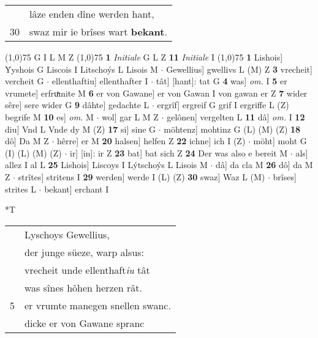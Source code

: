 \documentclass[8pt,a4paper,notitlepage]{article}
\begin{document}
\begin{table}[ht]
\begin{minipage}[t]{0.5\linewidth}
\begin{tabular}{rl}
 & lâze enden dîne werden hant,\\ 
30 & swaz mir ie brîses wart \textbf{bekant}.\\ 
\end{tabular}
\scriptsize
\line(1,0){75} \newline
G I L M Z \newline
\line(1,0){75} \newline
\textbf{1} \textit{Initiale} G L Z  \textbf{11} \textit{Initiale} I  \newline
\line(1,0){75} \newline
\textbf{1} Lishois] Ẏyshois G Liscois I Litschoýs L Lisois M  $\cdot$ Gewellius] gwellivs L (M) Z \textbf{3} vrecheit] vercheit G  $\cdot$ ellenthaftiu] ellenthafter I  $\cdot$ tât] [hant]: tat G \textbf{4} was] \textit{om.} I \textbf{5} er vrumete] erfruͯmite M \textbf{6} er von Gawane] er von Gawan I von gawan er Z \textbf{7} wider sêre] sere wider G \textbf{9} dâhte] gedachte L  $\cdot$ ergrîf] ergreif G grif I ergriffe L (Z) begrife M \textbf{10} es] \textit{om.} M  $\cdot$ wol] gar L M Z  $\cdot$ gelônen] vergelten L \textbf{11} dâ] \textit{om.} I \textbf{12} diu] Vnd L Vnde dy M (Z) \textbf{17} si] sine G  $\cdot$ möhtenz] mohtinz G (L) (M) (Z) \textbf{18} dô] Da M Z  $\cdot$ hêrre] er M \textbf{20} halsen] helfen Z \textbf{22} ichne] ich I (Z)  $\cdot$ möht] moht G (I) (L) (M) (Z)  $\cdot$ ir] [in]: ir Z \textbf{23} bat] bat sich Z \textbf{24} Der was also e bereit M  $\cdot$ als] allez I al L \textbf{25} Lishois] Liscoys I Lýtschoýs L Lisois M  $\cdot$ dâ] da cla M \textbf{26} dô] da M Z  $\cdot$ strîtes] stritens I \textbf{29} werden] werde I (L) (Z) \textbf{30} swaz] Waz L (M)  $\cdot$ brîses] strites L  $\cdot$ bekant] erchant I \newline
\end{minipage}
\hspace{0.5cm}
\begin{minipage}[t]{0.5\linewidth}
\small
\begin{center}*T
\end{center}
\begin{tabular}{rl}
 & Lyschoys Gewellius,\\ 
 & der junge süeze, warp alsus:\\ 
 & vrecheit unde ellenthaft\textit{iu} tât\\ 
 & was sînes hôhen herzen rât.\\ 
5 & er vrumte manegen snellen swanc.\\ 
 & dicke er von Gawane spranc\\ 

\end{tabular}
\end{minipage}
\end{table}
\end{document}
